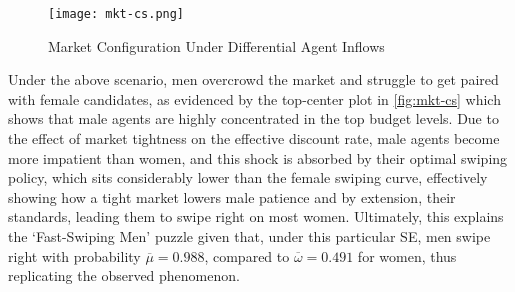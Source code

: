 \begin{figure}[ht]
    \centering
    \caption{Market Configuration Under Differential Agent Inflows}
    \texttt{[image: mkt-cs.png]}
    \label{fig:mkt-cs} 
\end{figure} 

Under the above scenario, men overcrowd the market and struggle to get paired with female candidates, as evidenced by the top-center plot in \autoref{fig:mkt-cs} which shows that male agents are highly concentrated in the top budget levels. 
Due to the effect of market tightness on the effective discount rate, male agents become more impatient than women, and this shock is absorbed by their optimal swiping policy, which sits considerably lower than the female swiping curve, effectively showing how a tight market lowers male patience and by extension, their standards, leading them to swipe right on most women. 
Ultimately, this explains the `Fast-Swiping Men' puzzle given that, under this particular SE, men swipe right with probability $\overline\mu=0.988$, compared to $\overline\omega=0.491$ for women, thus replicating the observed phenomenon. 

